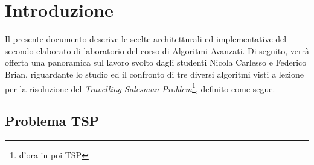 \section{Introduzione}
Il presente documento descrive le scelte architetturali ed implementative del secondo elaborato di laboratorio del corso di Algoritmi Avanzati. Di seguito, verrà offerta una panoramica sul lavoro svolto dagli studenti Nicola Carlesso e Federico Brian, riguardante lo studio ed il confronto di tre diversi algoritmi visti a lezione per la risoluzione del \emph{Travelling Salesman Problem}\footnote{d'ora in poi TSP}, definito come segue.

\subsection{Problema TSP}
\emph{}

